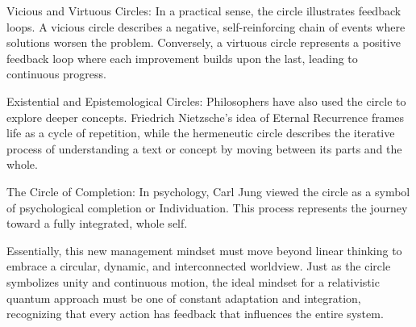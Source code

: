 \documentclass{article}
\begin{document}
    Vicious and Virtuous Circles: In a practical sense, the circle illustrates feedback loops. A vicious circle describes a negative, self-reinforcing chain of events where solutions worsen the problem. Conversely, a virtuous circle represents a positive feedback loop where each improvement builds upon the last, leading to continuous progress.

    Existential and Epistemological Circles: Philosophers have also used the circle to explore deeper concepts. Friedrich Nietzsche's idea of Eternal Recurrence frames life as a cycle of repetition, while the hermeneutic circle describes the iterative process of understanding a text or concept by moving between its parts and the whole.

    The Circle of Completion: In psychology, Carl Jung viewed the circle as a symbol of psychological completion or Individuation. This process represents the journey toward a fully integrated, whole self.

Essentially, this new management mindset must move beyond linear thinking to embrace a circular, dynamic, and interconnected worldview. Just as the circle symbolizes unity and continuous motion, the ideal mindset for a relativistic quantum approach must be one of constant adaptation and integration, recognizing that every action has feedback that influences the entire system.
\end{document}
